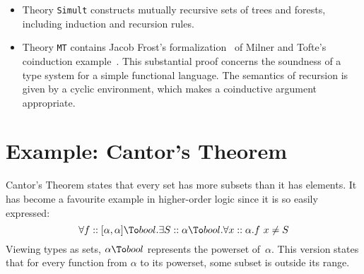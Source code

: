 \begin{itemize}
\item Theory {\tt Simult} constructs mutually recursive sets of trees and
  forests, including induction and recursion rules.

\item Theory {\tt MT} contains Jacob Frost's formalization~\cite{frost93} of
  Milner and Tofte's coinduction example~\cite{milner-coind}.  This
  substantial proof concerns the soundness of a type system for a simple
  functional language.  The semantics of recursion is given by a cyclic
  environment, which makes a coinductive argument appropriate.
\end{itemize}


\goodbreak
\section{Example: Cantor's Theorem}\label{sec:hol-cantor}
Cantor's Theorem states that every set has more subsets than it has
elements.  It has become a favourite example in higher-order logic since
it is so easily expressed:
\[  \forall f::[\alpha,\alpha]\To bool. \exists S::\alpha\To bool.
    \forall x::\alpha. f~x \not= S 
\] 
%
Viewing types as sets, $\alpha\To bool$ represents the powerset
of~$\alpha$.  This version states that for every function from $\alpha$ to
its powerset, some subset is outside its range.  

